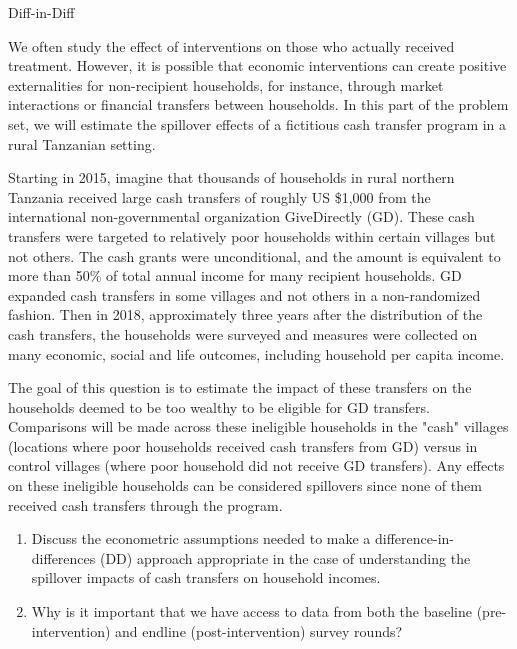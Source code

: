 \begin{homeworkProblem}{Diff-in-Diff}
    
    We often study the effect of interventions on those who actually 
    received treatment. However, it is possible that economic 
    interventions can create positive externalities for non-recipient 
    households, for instance, through market interactions or financial 
    transfers between households. In this part of the problem set, we 
    will estimate the spillover effects of a fictitious cash transfer 
    program in a rural Tanzanian setting.

    Starting in 2015, imagine that thousands of households in rural 
    northern Tanzania received large cash transfers of roughly US 
    \$1,000 from the international non-governmental organization 
    GiveDirectly (GD). These cash transfers were targeted to relatively 
    poor households within certain villages but not others. The cash 
    grants were unconditional, and the amount is equivalent to more 
    than 50\% of total annual income for many recipient households. GD 
    expanded cash transfers in some villages and not others in a 
    non-randomized fashion. Then in 2018, approximately three years 
    after the distribution of the cash transfers, the households were 
    surveyed and measures were collected on many economic, social and 
    life outcomes, including household per capita income.

    The goal of this question is to estimate the impact of these 
    transfers on the households deemed to be too wealthy to be eligible 
    for GD transfers. Comparisons will be made across these ineligible 
    households in the "cash" villages (locations where poor households 
    received cash transfers from GD) versus in control villages (where 
    poor household did not receive GD transfers). Any effects on these 
    ineligible households can be considered spillovers since none of 
    them received cash transfers through the program.
        
    \begin{enumerate}
        \item Discuss the econometric assumptions needed to make a 
            difference-in-differences (DD) approach appropriate in the case 
            of understanding the spillover impacts of cash transfers on 
            household incomes.

        \item Why is it important that we have access to data from both 
            the baseline (pre-intervention) and endline (post-intervention) 
            survey rounds?


\end{enumerate}
\end{homeworkProblem}
